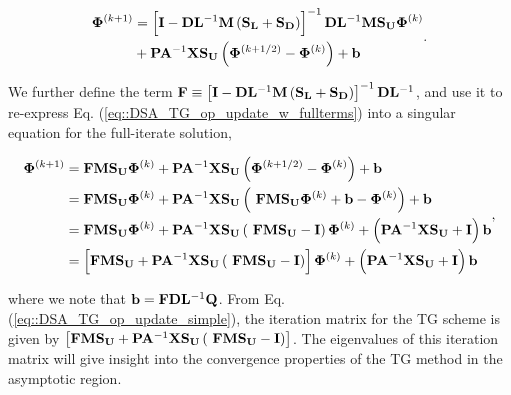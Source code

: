 \begin{equation}
\label{eq::DSA_TG_op_update_w_fullterms}
\begin{aligned}
 {\bf \Phi}^{(k+1)} &=  \left[ {\bf I} - {\bf D}{\bf L}^{-1} {\bf M} \left(  {\bf S_L} + {\bf S_D} \right) \right]^{-1} {\bf D}{\bf L}^{-1}  {\bf M} {\bf S_U} {\bf \Phi}^{(k)} \\
  &+  {\bf P} {\bf A}^{-1}  {\bf X} {\bf S_{U}} \left(  {\bf \Phi}^{(k+1/2)} - {\bf \Phi}^{(k)}  \right) + {\bf b}
\end{aligned} .
\end{equation}

\noindent We further define the term ${\bf F} \equiv \left[ {\bf I} - {\bf D}{\bf L}^{-1} {\bf M} \left(  {\bf S_L} + {\bf S_D} \right) \right]^{-1} {\bf D}{\bf L}^{-1}$, and use it to re-express Eq. (\ref{eq::DSA_TG_op_update_w_fullterms}) into a singular equation for the full-iterate solution,

\begin{equation}
\label{eq::DSA_TG_op_update_simple}
\begin{aligned}
 {\bf \Phi}^{(k+1)} &=  {\bf F}  {\bf M} {\bf S_U} {\bf \Phi}^{(k)} +  {\bf P} {\bf A}^{-1}  {\bf X} {\bf S_{U}} \left(  {\bf \Phi}^{(k+1/2)} - {\bf \Phi}^{(k)}  \right) + {\bf b} \\
&= {\bf F}  {\bf M} {\bf S_U} {\bf \Phi}^{(k)} +  {\bf P} {\bf A}^{-1}  {\bf X} {\bf S_{U}} \left(  \ {\bf F}  {\bf M} {\bf S_U} {\bf \Phi}^{(k)} + {\bf b} - {\bf \Phi}^{(k)}  \right) + {\bf b} \\
&= {\bf F}  {\bf M} {\bf S_U} {\bf \Phi}^{(k)} +  {\bf P} {\bf A}^{-1}  {\bf X} {\bf S_{U}} \left(  \ {\bf F}  {\bf M} {\bf S_U}  -  {\bf I} \right){\bf \Phi}^{(k)} + \left(  {\bf P} {\bf A}^{-1}  {\bf X} {\bf S_{U}}  + {\bf I} \right) {\bf b} \\
&= \left[ {\bf F}  {\bf M} {\bf S_U} +  {\bf P} {\bf A}^{-1}  {\bf X} {\bf S_{U}} \left(  \ {\bf F}  {\bf M} {\bf S_U}  -  {\bf I} \right) \right] {\bf \Phi}^{(k)} + \left(  {\bf P} {\bf A}^{-1}  {\bf X} {\bf S_{U}}  + {\bf I} \right) {\bf b}
\end{aligned} ,
\end{equation}

\noindent where we note that ${\bf b}={\bf F} {\bf D}{\bf L}^{-1}  {\bf Q}$. From Eq. (\ref{eq::DSA_TG_op_update_simple}), the iteration matrix for the TG scheme is given by $\left[ {\bf F}  {\bf M} {\bf S_U} +  {\bf P} {\bf A}^{-1}  {\bf X} {\bf S_{U}} \left(  \ {\bf F}  {\bf M} {\bf S_U}  -  {\bf I} \right) \right]$. The eigenvalues of this iteration matrix will give insight into the convergence properties of the TG method in the asymptotic region.


